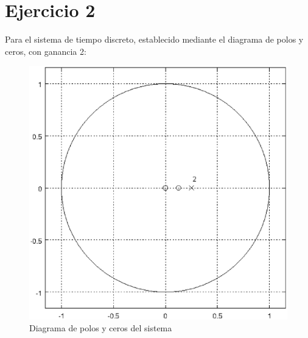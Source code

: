 \documentclass[a4paper,12pt]{article}
\begin{document}
\section{Ejercicio 2}
Para el sistema de tiempo discreto, establecido mediante el diagrama de polos y ceros, con ganancia 2:
\begin{figure}[H]
    \begin{center}
        \includegraphics[width=0.7\linewidth]{polosZeros1.eps}
        \caption{Diagrama de polos y ceros del sistema}
        \label{fig:polosZeros1}
    \end{center}
\end{figure}
\end{document}
